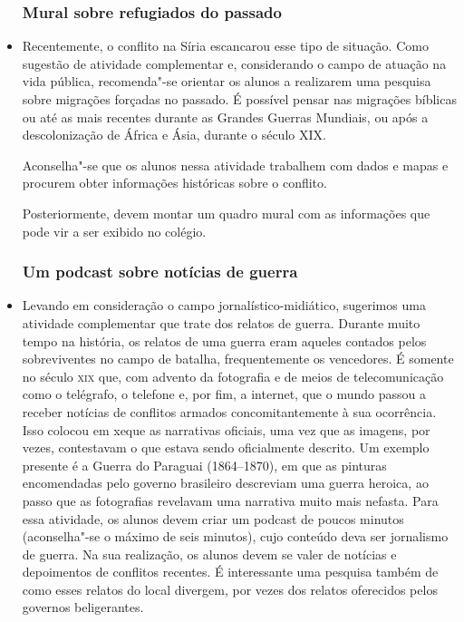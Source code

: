 \documentclass[12pt]{extarticle}
\begin{document}
\begin{itemize}
\subsubsection{Mural sobre refugiados do passado}

\item Recentemente, o conflito na Síria escancarou esse tipo de situação.
Como sugestão de atividade complementar e, considerando
o campo de atuação na vida pública, recomenda"-se orientar os alunos a realizarem uma pesquisa sobre
migrações forçadas no passado. É possível pensar nas migrações bíblicas ou 
até as mais recentes durante as Grandes Guerras Mundiais, ou 
após a descolonização de África e Ásia, durante o século XIX.

Aconselha"-se que os alunos nessa atividade trabalhem com dados e mapas
e procurem obter informações históricas sobre o conflito.

Posteriormente, devem montar um quadro mural com as informações que
pode vir a ser exibido no colégio.

\subsubsection{Um podcast sobre notícias de guerra}

\item Levando em consideração o campo jornalístico-midiático, sugerimos
uma atividade complementar que trate dos relatos de guerra.
Durante muito tempo na história, os relatos de uma guerra eram aqueles
contados pelos sobreviventes no campo de batalha, frequentemente os
vencedores. É somente no século \textsc{xix} que, com advento da fotografia e
de meios de telecomunicação como o telégrafo, o telefone e, por fim, a
internet, que o mundo passou a receber notícias de conflitos armados
concomitantemente à sua ocorrência. Isso colocou em xeque as
narrativas oficiais, uma vez que as imagens, por vezes, contestavam o
que estava sendo oficialmente descrito. Um exemplo presente é a Guerra
do Paraguai (1864--1870), em que as pinturas encomendadas pelo governo
brasileiro descreviam uma guerra heroica, ao passo que as fotografias
revelavam uma narrativa muito mais nefasta. Para essa atividade, os
alunos devem criar um podcast de poucos minutos (aconselha"-se o máximo
de seis minutos), cujo conteúdo deva ser jornalismo de guerra. Na sua
realização, os alunos devem se valer de notícias e depoimentos de
conflitos recentes. É interessante uma pesquisa também de como esses
relatos do local divergem, por vezes dos relatos oferecidos pelos
governos beligerantes.


\end{itemize}
\end{document}
